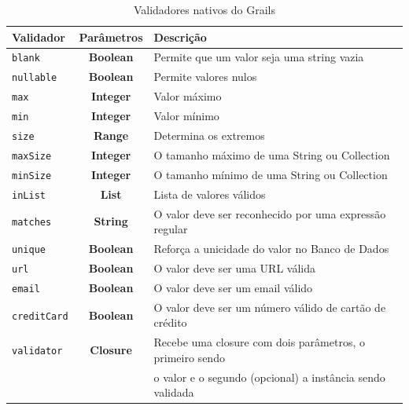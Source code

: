 \documentclass[12pt]{article}
\begin{document}
  \begin{table}[h!]
        \centering
        \caption{Validadores nativos do Grails}
        \label{tab:Validadores}
        \begin{tabular}{| l | c | l |}
        \hline
        {\bf Validador} & {\bf Parâmetros} & {\bf Descrição} \\
        \hline
            \texttt{blank} & \textbf{Boolean} & Permite que um valor seja uma string vazia \\
        \hline
            \texttt{nullable} & \textbf{Boolean} & Permite valores nulos \\
        \hline
            \texttt{max} & \textbf{Integer}  & Valor máximo \\
        \hline
            \texttt{min} & \textbf{Integer} & Valor mínimo \\
        \hline
            \texttt{size} & \textbf{Range} &  Determina os extremos \\
        \hline
            \texttt{maxSize}  & \textbf{Integer} & O tamanho máximo de uma String ou Collection \\
        \hline
            \texttt{minSize} & \textbf{Integer} & O tamanho mínimo de uma String ou Collection \\
        \hline
            \texttt{inList} & \textbf{List} & Lista de valores válidos \\ 
        \hline
            \texttt{matches} & \textbf{String} &  O valor deve ser reconhecido por uma expressão regular \\
        \hline
            \texttt{unique} & \textbf{Boolean} &  Reforça a unicidade do valor no Banco de Dados \\
        \hline
            \texttt{url} & \textbf{Boolean} & O valor deve ser uma URL válida \\
        \hline
            \texttt{email} & \textbf{Boolean} & O valor deve ser um email válido \\
        \hline
            \texttt{creditCard} & \textbf{Boolean} & O valor deve ser um número válido de cartão de crédito \\
        \hline
            \texttt{validator} & \textbf{Closure} & Recebe uma closure com dois parâmetros, o primeiro sendo \\
                               &                  & o valor e o segundo (opcional) a instância sendo validada \\
        \hline
        \end{tabular}  
    \end{table}
  
\end{document}
